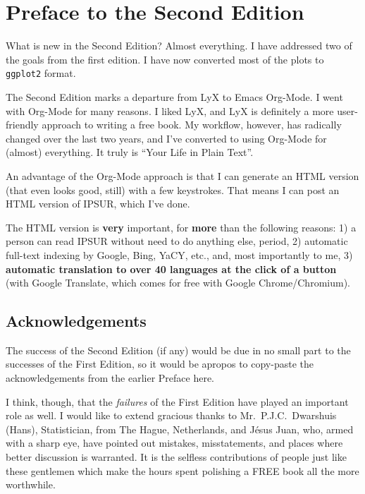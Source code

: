 
\cleardoublepage
{}
{}

\chapter*{Preface to the Second Edition}

What is new in the Second Edition?  Almost everything.  I have addressed two of the goals from the first edition.  I have now converted most of the plots to \texttt{ggplot2} format. 

The Second Edition marks a departure from LyX to Emacs Org-Mode.  I went with Org-Mode for many reasons.  I liked LyX, and LyX is definitely a more user-friendly approach to writing a free book.  My workflow, however, has radically changed over the last two years, and I've converted to using Org-Mode for (almost) everything.  It truly is ``Your Life in Plain Text''.

An advantage of the Org-Mode approach is that I can generate an HTML version (that even looks good, still) with a few keystrokes.  That means I can post an HTML version of IPSUR, which I've done.  

The HTML version is \textbf{very} important, for \textbf{more} than the following reasons:  1) a person can read IPSUR without need to do anything else, period, 2) automatic full-text indexing by Google, Bing, YaCY, etc., and, most importantly to me, 3) \textbf{automatic translation to over 40 languages at the click of a button} (with Google Translate, which comes for free with Google Chrome/Chromium).


\section*{Acknowledgements}

The success of the Second Edition (if any) would be due in no small part to the successes of the First Edition, so it would be apropos to copy-paste the acknowledgements from the earlier Preface here.

I think, though, that the \emph{failures} of the First Edition have played an important role as well. I would like to extend gracious thanks to Mr.\ P.J.C.\ Dwarshuis (Hans), Statistician, from The Hague, Netherlands, and J\'{e}{}sus Juan, who, armed with a sharp eye, have pointed out mistakes, misstatements, and places where better discussion is warranted.  It is the selfless contributions of people just like these gentlemen which make the hours spent polishing a FREE book all the more worthwhile.